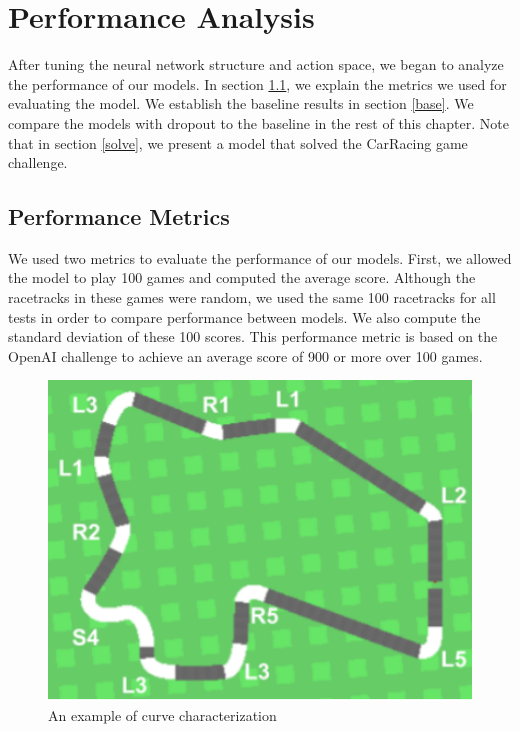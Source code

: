 \chapter{Performance Analysis}\label{Ch:Analyze}

After tuning the neural network structure and action space, we began to analyze the performance of our models. In section \ref{perf}, we explain the metrics we used for evaluating the model. We establish the baseline results in section \ref{base}. We compare the models with dropout to the baseline in the rest of this chapter. Note that in section \ref{solve}, we present a model that solved the CarRacing game challenge.

\section{Performance Metrics} \label{perf}
We used two metrics to evaluate the performance of our models. First, we allowed the model to play 100 games and computed the average score. Although the racetracks in these games were random, we used the same 100 racetracks for all tests in order to compare performance between models. We also compute the standard deviation of these 100 scores. This performance metric is based on the OpenAI challenge to achieve an average score of 900 or more over 100 games. 

\begin{figure}[H]
\centering\includegraphics[scale=0.6,clip]
{Graphics/curve_characterization.png}
\caption[Curve Characterization]{An example of curve characterization}
\label{fig:curves}
\end{figure}

